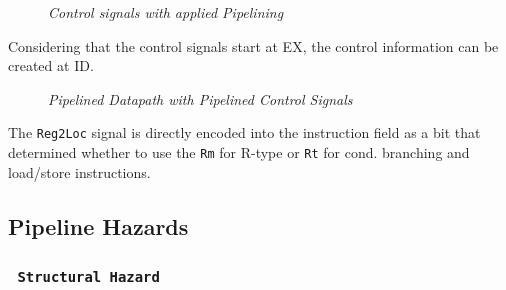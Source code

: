 \documentclass[11pt]{article}
\begin{document}
\begin{figure}[htbp]
    \centering
    \caption{\textit{Control signals with applied Pipelining}}
\end{figure}

Considering that the control signals start at EX, the control information can be created at ID.

\begin{figure}[htbp]
    \centering
    \caption{\textit{Pipelined Datapath with Pipelined Control Signals}}
\end{figure}

The \texttt{Reg2Loc} signal is directly encoded into the instruction field as a bit that determined whether to use the \texttt{Rm} for R-type or \texttt{Rt} for cond. branching and load/store instructions.

\subsection*{Pipeline Hazards}

\subsubsection*{\rightarrow \ \texttt{Structural Hazard}}
\vspace{-0.5em}
\end{document}
